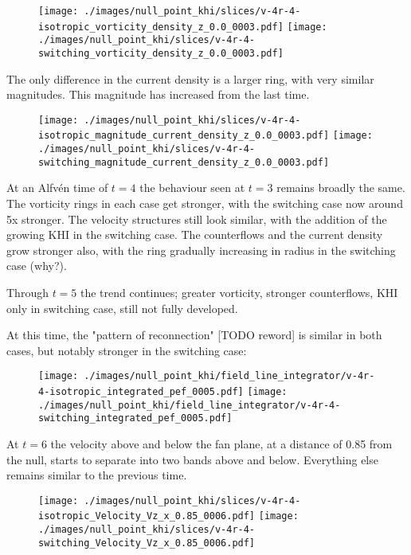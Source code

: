\begin{figure}[H]
  \centering
  \texttt{[image: ./images/null\_point\_khi/slices/v-4r-4-isotropic\_vorticity\_density\_z\_0.0\_0003.pdf]}
  \texttt{[image: ./images/null\_point\_khi/slices/v-4r-4-switching\_vorticity\_density\_z\_0.0\_0003.pdf]}
\end{figure}

The only difference in the current density is a larger ring, with very similar magnitudes. This magnitude has increased from the last time.

\begin{figure}[H]
  \centering
  \texttt{[image: ./images/null\_point\_khi/slices/v-4r-4-isotropic\_magnitude\_current\_density\_z\_0.0\_0003.pdf]}
  \texttt{[image: ./images/null\_point\_khi/slices/v-4r-4-switching\_magnitude\_current\_density\_z\_0.0\_0003.pdf]}
\end{figure}

At an Alfv\'en time of $t=4$ the behaviour seen at $t=3$ remains  broadly the same. The vorticity rings in each case get stronger, with the switching case now around 5x stronger. The velocity structures still look similar, with the addition of the growing KHI in the switching case. The counterflows and the current density grow stronger also, with the ring gradually increasing in radius in the switching case (why?).

Through $t=5$ the trend continues; greater vorticity, stronger counterflows, KHI only in switching case, still not fully developed.

At this time, the "pattern of reconnection" [TODO reword] is similar in both cases, but notably stronger in the switching case:

\begin{figure}[H]
  \centering
  \texttt{[image: ./images/null\_point\_khi/field\_line\_integrator/v-4r-4-isotropic\_integrated\_pef\_0005.pdf]}
  \texttt{[image: ./images/null\_point\_khi/field\_line\_integrator/v-4r-4-switching\_integrated\_pef\_0005.pdf]}
\end{figure}

At $t=6$ the velocity above and below the fan plane, at a distance of 0.85 from the null, starts to separate into two bands above and below. Everything else remains similar to the previous time.

\begin{figure}[H]
  \centering
  \texttt{[image: ./images/null\_point\_khi/slices/v-4r-4-isotropic\_Velocity\_Vz\_x\_0.85\_0006.pdf]}
  \texttt{[image: ./images/null\_point\_khi/slices/v-4r-4-switching\_Velocity\_Vz\_x\_0.85\_0006.pdf]}
\end{figure}

